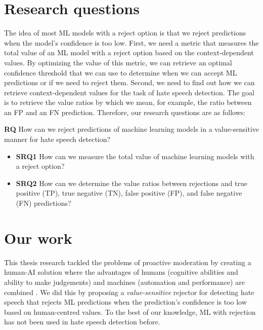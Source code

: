 \section{Research questions}
%
The idea of most ML models with a reject option is that we reject predictions when the model's confidence is too low.
%
First, we need a metric that measures the total value of an ML model with a reject option based on the context-dependent values.
%
By optimizing the value of this metric, we can retrieve an optimal confidence threshold that we can use to determine when we can accept ML predictions or if we need to reject them.
%
Second, we need to find out how we can retrieve context-dependent values for the task of hate speech detection.
%
The goal is to retrieve the value ratios by which we mean, for example, the ratio between an FP and an FN prediction.
%
Therefore, our research questions are as follows:
%

\begin{flushleft}
	\textbf{RQ} How can we reject predictions of machine learning models in a value-sensitive manner for hate speech detection?
	\begin{itemize}
		\item \textbf{SRQ1} How can we measure the total value of machine learning models with a reject option?
		\item \textbf{SRQ2} How can we determine the value ratios between rejections and true positive (TP), true negative (TN), false positive (FP), and false negative (FN) predictions?
	\end{itemize}
\end{flushleft}

\section{Our work}
This thesis research tackled the problems of proactive moderation by creating a human-AI solution where the advantages of humans (cognitive abilities and ability to make judgements) and machines (automation and performance) are combined \citep{woo2020future}.
%
We did this by proposing a \emph{value-sensitive} rejector for detecting hate speech that rejects ML predictions when the prediction's confidence is too low based on human-centred values.
%
To the best of our knowledge, ML with rejection has not been used in hate speech detection before.
%

